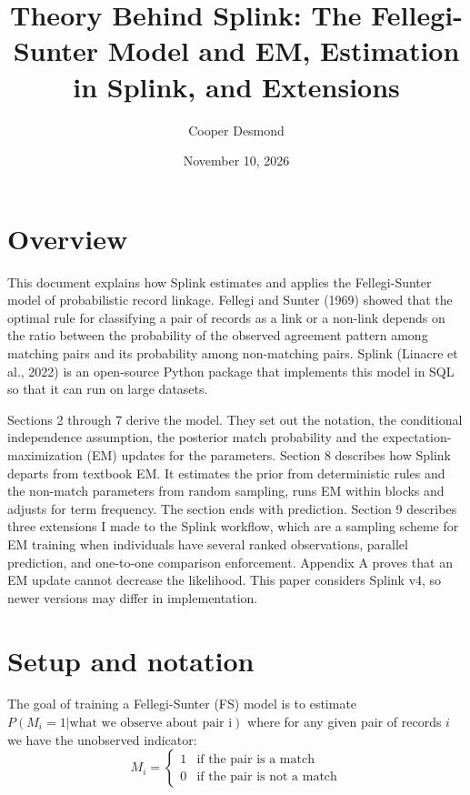 \documentclass[11pt]{article}
\title{Theory Behind Splink: The Fellegi-Sunter Model and EM, Estimation in Splink, and Extensions}
\author{Cooper Desmond}
\date{November 10, 2026}
\begin{document}
\maketitle

\section{Overview}

This document explains how Splink estimates and applies the Fellegi-Sunter model of probabilistic record linkage. Fellegi and Sunter (1969) showed that the optimal rule for classifying a pair of records as a link or a non-link depends on the ratio between the probability of the observed agreement pattern among matching pairs and its probability among non-matching pairs. Splink (Linacre et al., 2022) is an open-source Python package that implements this model in SQL so that it can run on large datasets.

Sections 2 through 7 derive the model. They set out the notation, the conditional independence assumption, the posterior match probability and the expectation-maximization (EM) updates for the parameters. Section 8 describes how Splink departs from textbook EM. It estimates the prior from deterministic rules and the non-match parameters from random sampling, runs EM within blocks and adjusts for term frequency. The section ends with prediction. Section 9 describes three extensions I made to the Splink workflow, which are a sampling scheme for EM training when individuals have several ranked observations, parallel prediction, and one-to-one comparison enforcement. Appendix A proves that an EM update cannot decrease the likelihood. This paper considers Splink v4, so newer versions may differ in implementation.

\tableofcontents

\section{Setup and notation}

The goal of training a Fellegi-Sunter (FS) model is to estimate $P(M_i = 1 | \text{what we observe about pair i})$ where for any given pair of records $i$ we have the unobserved indicator:
\[
M_i =
\begin{cases}
1 & \text{if the pair is a match} \\
0 & \text{if the pair is not a match}
\end{cases}
\]
\end{document}
